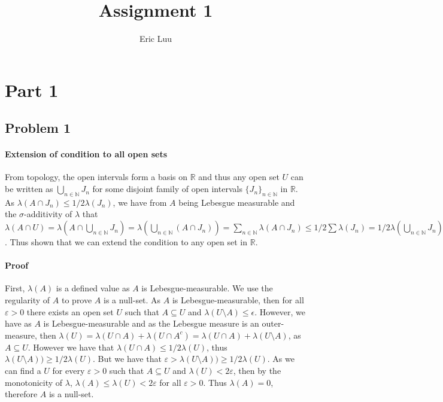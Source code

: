 \documentclass{article}
\title{Assignment 1}
\author{Eric Luu}
\theoremstyle{definition}
\numberwithin{theorem}{section}
\numberwithin{equation}{section}
\begin{document}
\maketitle
\section{Part 1}
\subsection{Problem 1}
\paragraph{Extension of condition to all open sets}
From topology, the open intervals form a basis on $\mathbb{R}$ and thus any open set $U$ can be written as $\bigcup_{n \in \mathbb{N}} J_n$ for some disjoint family of open intervals $\lbrace J_n \rbrace_{n \in \mathbb{N}}$ in $\mathbb{R}$. As $\lambda(A \cap J_n) \leq 1/2 \lambda(J_n)$, we have from $A$ being Lebesgue measurable and the $\sigma$-additivity of $\lambda$ that $ \lambda(A \cap U) = \lambda(A \cap \bigcup_{n \in \mathbb{N}} J_n)= \lambda(\bigcup_{n \in \mathbb{N}} (A \cap J_n)) =\sum_{n \in \mathbb{N}} \lambda(A \cap J_n) \leq 1/2 \sum \lambda(J_n) = 1/2 \lambda(\bigcup_{n \in \mathbb{N}} J_n) = 1/2 \lambda(U)$. Thus shown that we can extend the condition to any open set in $\mathbb{R}$. 
\paragraph{Proof}
First, $\lambda(A)$ is a defined value as $A$ is Lebesgue-measurable. We use the regularity of $A$ to prove $A$ is a null-set. As $A$ is Lebesgue-measurable, then for all $\varepsilon > 0$ there exists an open set $U$ such that $A \subseteq U$ and $\lambda(U\setminus A) \leq \epsilon$. However, we have as $A$ is Lebesgue-measurable and as the Lebesgue measure is an outer-measure, then $\lambda(U) = \lambda(U \cap A) + \lambda(U \cap A^c) = \lambda(U \cap A) + \lambda(U \setminus A)$, as $A \subseteq U$. However we have that $\lambda(U \cap A) \leq 1/2 \lambda(U)$, thus $\lambda(U \setminus A)) \geq 1/2 \lambda(U)$. But we have that $\varepsilon> \lambda(U \setminus A)) \geq 1/2 \lambda(U)$. As we can find a $U$ for every $\varepsilon> 0$ such that $A \subseteq U$ and $\lambda(U) < 2 \varepsilon$, then by the monotonicity of $\lambda$, $\lambda(A) \leq \lambda(U) < 2 \varepsilon$ for all $\varepsilon > 0$. Thus $\lambda(A) = 0$, therefore $A$ is a null-set.  
\end{document}
